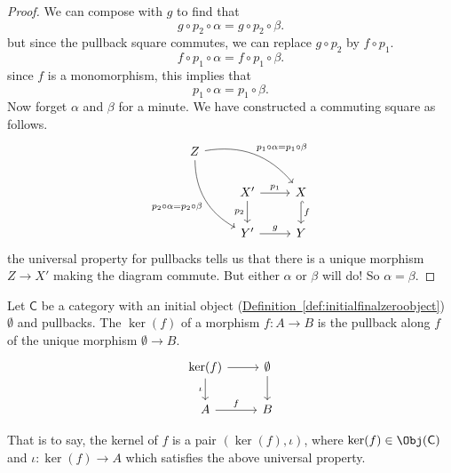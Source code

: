 \documentclass[main.tex]{subfiles}
\begin{document}
\begin{proof}
  We can compose with $g$ to find that
  \begin{equation*}
    g \circ p_{2} \circ \alpha = g \circ p_{2} \circ \beta.
  \end{equation*}
  but since the pullback square commutes, we can replace $g \circ p_{2}$ by $f \circ p_{1}$.
  \begin{equation*}
    f \circ p_{1} \circ \alpha = f \circ p_{1} \circ \beta.
  \end{equation*}
  since $f$ is a monomorphism, this implies that
  \begin{equation*}
    p_{1} \circ \alpha = p_{1} \circ \beta.
  \end{equation*}
  Now forget $\alpha$ and $\beta$ for a minute. We have constructed a commuting square as follows.
  \begin{equation*}
    \begin{tikzcd}
      Z
      \arrow[drr, bend left, "p_{1} \circ \alpha = p_{1} \circ \beta"]
      \arrow[ddr, swap, bend right, "p_{2} \circ \alpha = p_{2} \circ \beta"]
      \\
      & X'
      \arrow[r, "p_{1}"]
      \arrow[d, swap, "p_{2}"]
      & X
      \arrow[d, hookrightarrow, "f"]
      \\
      & Y'
      \arrow[r, "g"]
      & Y
    \end{tikzcd}
  \end{equation*}
  the universal property for pullbacks tells us that there is a unique morphism $Z \to X'$ making the diagram commute. But either $\alpha$ or $\beta$ will do! So $\alpha = \beta$.
\end{proof}

\begin{definition}
  \label{def:kernelofmorphism}
  Let $\mathsf{C}$ be a category with an initial object (\hyperref[def:initialfinalzeroobject]{Definition~\ref*{def:initialfinalzeroobject}}) $\emptyset$ and pullbacks. The  $\ker(f)$ of a morphism $f\colon A \to B$ is the pullback along $f$ of the unique morphism $\emptyset \to B$.
  \begin{equation*}
    \begin{tikzcd}
      \ker(f) \arrow[d, swap, "\iota"] \arrow[r] & \emptyset \arrow[d] \\
      A \arrow[r, "f"] & B
    \end{tikzcd}
  \end{equation*}

  That is to say, the kernel of $f$ is a pair $(\ker(f), \iota)$, where $\ker(f) \in \Obj(\mathsf{C})$ and $\iota\colon \ker(f) \to A$ which satisfies the above universal property.
\end{definition}
\end{document}
